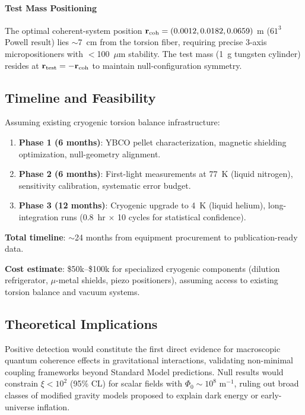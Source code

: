 \documentclass[10pt,twocolumn]{article}
\begin{document}
\paragraph{Test Mass Positioning}
The optimal coherent-system position ${\bf r}_{\text{coh}} = (0.0012, 0.0182, 0.0659)$ m ($61^3$ Powell result) lies $\sim$7~cm from the torsion fiber, requiring precise 3-axis micropositioners with $<$100~$\mu$m stability. The test mass (1~g tungsten cylinder) resides at ${\bf r}_{\text{test}} = -{\bf r}_{\text{coh}}$ to maintain null-configuration symmetry.

\subsection{Timeline and Feasibility}

Assuming existing cryogenic torsion balance infrastructure:

\begin{enumerate}
\item \textbf{Phase 1 (6 months)}: YBCO pellet characterization, magnetic shielding optimization, null-geometry alignment.
\item \textbf{Phase 2 (6 months)}: First-light measurements at 77~K (liquid nitrogen), sensitivity calibration, systematic error budget.
\item \textbf{Phase 3 (12 months)}: Cryogenic upgrade to 4~K (liquid helium), long-integration runs (0.8~hr $\times$ 10 cycles for statistical confidence).
\end{enumerate}

\textbf{Total timeline}: $\sim$24 months from equipment procurement to publication-ready data.

\textbf{Cost estimate}: \$50k--\$100k for specialized cryogenic components (dilution refrigerator, $\mu$-metal shields, piezo positioners), assuming access to existing torsion balance and vacuum systems.

\subsection{Theoretical Implications}

Positive detection would constitute the first direct evidence for macroscopic quantum coherence effects in gravitational interactions, validating non-minimal coupling frameworks beyond Standard Model predictions. Null results would constrain $\xi < 10^2$ (95\% CL) for scalar fields with $\Phi_0 \sim 10^8$ m$^{-1}$, ruling out broad classes of modified gravity models proposed to explain dark energy or early-universe inflation.
\end{document}
